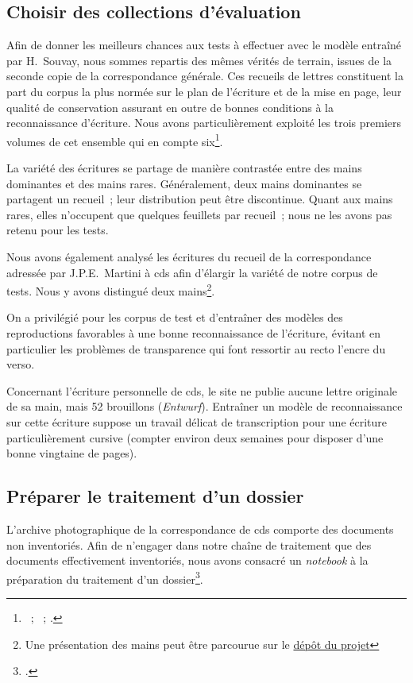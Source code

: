 \documentclass[a4paper,12pt,twoside]{book}
\begin{document}
			\subsection{Choisir des collections d'évaluation}
				Afin de donner les meilleurs chances aux tests à effectuer avec le modèle entraîné par H.~Souvay, nous sommes repartis des mêmes vérités de terrain, issues de la seconde copie de la correspondance générale. Ces recueils de lettres constituent la part du corpus la plus normée sur le plan de l'écriture et de la mise en page, leur qualité de conservation assurant en outre de bonnes conditions à la reconnaissance d'écriture. Nous avons particulièrement exploité les trois premiers volumes de cet ensemble qui en compte six\footnote{\cite{salmCorrespondanceGeneraleSecondea}~; \cite{salmCorrespondanceGeneraleSeconde}~; \cite{salmCorrespondanceGeneraleSecondeb}.}.
				
				La variété des écritures se partage de manière contrastée entre des mains dominantes et des mains rares. Généralement, deux mains dominantes se partagent un recueil~; leur distribution peut être discontinue. Quant aux mains rares, elles n'occupent que quelques feuillets par recueil~; nous ne les avons pas retenu pour les tests.
				
				Nous avons également analysé les écritures du recueil de la correspondance adressée par J.P.E.~Martini à \gls{cds} afin d'élargir la variété de notre corpus de tests. Nous y avons distingué deux mains\footnote{Une présentation des mains peut être parcourue sur le \href{https://github.com/sbiay/CdS-edition/tree/main/htr/sources}{dépôt du projet}}.
				
				On a privilégié pour les corpus de test et d'entraîner des modèles des reproductions favorables à une bonne reconnaissance de l'écriture, évitant en particulier les problèmes de transparence qui font ressortir au recto l'encre du verso.
				
				Concernant l'écriture personnelle de \gls{cds}, le site ne publie aucune lettre originale de sa main, mais 52 brouillons (\textit{Entwurf}). Entraîner un modèle de reconnaissance sur cette écriture suppose un travail délicat de transcription pour une écriture particulièrement cursive (compter environ deux semaines pour disposer d'une bonne vingtaine de pages).
		
			\subsection{Préparer le traitement d'un dossier}
				L'archive photographique de la correspondance de \gls{cds} comporte des documents non inventoriés. Afin de n'engager dans notre chaîne de traitement que des documents effectivement inventoriés, nous avons consacré un \textit{notebook} à la préparation du traitement d'un dossier\footcite{biayPreparerTraitementDossier2022}.
				
\end{document}
